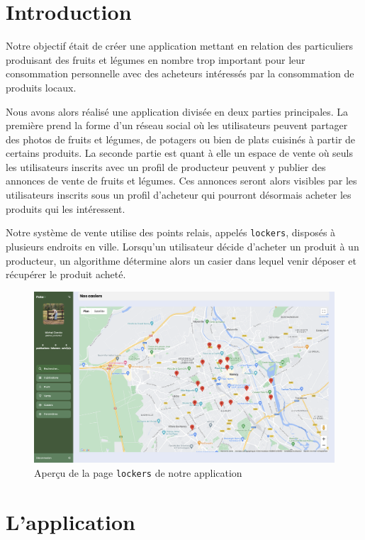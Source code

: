 \documentclass[11pt]{article}
\begin{document}
\tableofcontents
\newpage
\section{Introduction}

Notre objectif était de créer une application mettant en relation des particuliers produisant des fruits et légumes en nombre trop important pour leur consommation personnelle avec des acheteurs intéressés par la consommation de produits locaux.

Nous avons alors réalisé une application divisée en deux parties principales. La première prend la forme d'un réseau social où les utilisateurs peuvent partager des photos de fruits et légumes, de potagers ou bien de plats cuisinés à partir de certains produits. La seconde partie est quant à elle un espace de vente où seuls les utilisateurs inscrits avec un profil de producteur peuvent y publier des annonces de vente de fruits et légumes. Ces annonces seront alors visibles par les utilisateurs inscrits sous un profil d'acheteur qui pourront désormais acheter les produits qui les intéressent.

Notre système de vente utilise des points relais, appelés \texttt{lockers}, disposés à plusieurs endroits en ville. Lorsqu'un utilisateur décide d'acheter un produit à un producteur, un algorithme détermine alors un casier dans lequel venir déposer et récupérer le produit acheté.

\begin{figure}[h]
    \centering
    \includegraphics[scale=0.33]{ScreenCasiers.png}
    \caption{Aperçu de la page \texttt{lockers} de notre application}
\end{figure}

\newpage

\section{L'application}
\end{document}
